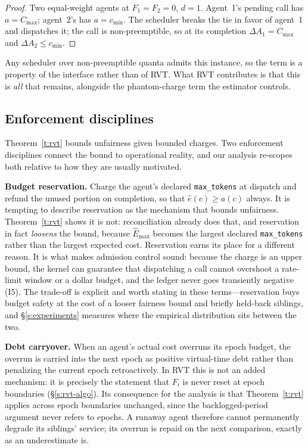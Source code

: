 \documentclass[letterpaper,11pt,leqno]{article}
\begin{document}
\begin{proof}
Two equal-weight agents at $F_1 = F_2 = 0$, $d = 1$. Agent~1's pending call has $a = C_{\max}$; agent~2's has $a = c_{\min}$. The scheduler breaks the tie in favor of agent~1 and dispatches it; the call is non-preemptible, so at its completion $\Delta A_1 = C_{\max}$ and $\Delta A_2 \le c_{\min}$.
\end{proof}

Any scheduler over non-preemptible quanta admits this instance, so the term is a property of the interface rather than of RVT. What RVT contributes is that this is \emph{all} that remains, alongside the phantom-charge term the estimator controls.

\subsection{Enforcement disciplines}\label{s:enforcement}

Theorem~\ref{t:rvt} bounds unfairness given bounded charges. Two enforcement disciplines connect the bound to operational reality, and our analysis re-scopes both relative to how they are usually motivated.

\textbf{Budget reservation.} Charge the agent's declared \texttt{max\_tokens} at dispatch and refund the unused portion on completion, so that $\hat{e}(c) \ge a(c)$ always. It is tempting to describe reservation as the mechanism that bounds unfairness. Theorem~\ref{t:rvt} shows it is not: reconciliation already does that, and reservation in fact \emph{loosens} the bound, because $\hat{E}_{\max}$ becomes the largest declared \texttt{max\_tokens} rather than the largest expected cost. Reservation earns its place for a different reason. It is what makes admission control sound: because the charge is an upper bound, the kernel can guarantee that dispatching a call cannot overshoot a rate-limit window or a dollar budget, and the ledger never goes transiently negative (I5). The trade-off is explicit and worth stating in these terms---reservation buys budget safety at the cost of a looser fairness bound and briefly held-back siblings, and \S\ref{s:experiments} measures where the empirical distribution sits between the two.

\textbf{Debt carryover.}\label{s:debt} When an agent's actual cost overruns its epoch budget, the overrun is carried into the next epoch as positive virtual-time debt rather than penalizing the current epoch retroactively. In RVT this is not an added mechanism: it is precisely the statement that $F_i$ is never reset at epoch boundaries (\S\ref{s:rvt-algo}). Its consequence for the analysis is that Theorem~\ref{t:rvt} applies across epoch boundaries unchanged, since the backlogged-period argument never refers to epochs. A runaway agent therefore cannot permanently degrade its siblings' service; its overrun is repaid on the next comparison, exactly as an underestimate is.
\end{document}
